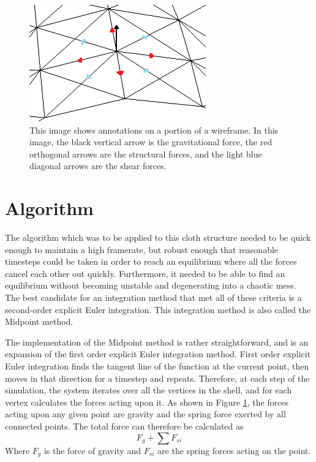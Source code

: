 \documentclass{thesis}
\begin{document}
\begin{figure}
\centering
\includegraphics[width=3in]{images/wireframe_detail.png}
\caption[Detail of a wireframe of a simulated model]{This image shows annotations on a portion of a wireframe.  In this image, the black
vertical arrow is the gravitational force, the red orthogonal arrows are the structural forces, and the light blue diagonal arrows are the
shear forces.}
\label{fig:wireframe_detail}
\end{figure}

\section{Algorithm}
The algorithm which was to be applied to this cloth structure needed to be quick enough to maintain a high framerate, but robust enough
that reasonable timesteps could be taken in order to reach an equilibrium where all the forces cancel each other out quickly.
Furthermore, it needed to be able to find an equilibrium without becoming unstable and degenerating into a chaotic mess.  The
best candidate for an integration method that met all of these criteria is a second-order explicit Euler integration.  This
integration method is also called the Midpoint method.

The implementation of the Midpoint method is rather straightforward, and is an expansion of the first order explicit Euler integration
method.  First order explicit Euler integration finds the tangent line of the function at the current point, then moves in that direction
for a timestep and repeats.  Therefore, at each step of the simulation, the system iterates over all the vertices in the shell, and for
each vertex calculates the forces acting upon it.  As shown in Figure \ref{fig:wireframe_detail}, the forces acting upon any given point are
gravity and the spring force exerted by all connected points.  The total force can therefore be calculated as \[F_g+\sum{F_{si}}\]
Where $F_g$ is the force of gravity and $F_{si}$ are the spring forces acting on the point.
\end{document}
